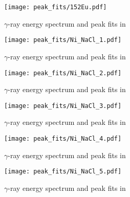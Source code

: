 \begin{figure}[htb]
\texttt{[image: peak\_fits/152Eu.pdf]}
\caption{$\gamma$-ray energy spectrum and peak fits in \texttt{}}
\label{fig:152Eu}
\end{figure}

\begin{figure}[htb]
\texttt{[image: peak\_fits/Ni\_NaCl\_1.pdf]}
\caption{$\gamma$-ray energy spectrum and peak fits in \texttt{}}
\label{fig:Ni_NaCl_1}
\end{figure}

\begin{figure}[htb]
\texttt{[image: peak\_fits/Ni\_NaCl\_2.pdf]}
\caption{$\gamma$-ray energy spectrum and peak fits in \texttt{}}
\label{fig:Ni_NaCl_2}
\end{figure}

\begin{figure}[htb]
\texttt{[image: peak\_fits/Ni\_NaCl\_3.pdf]}
\caption{$\gamma$-ray energy spectrum and peak fits in \texttt{}}
\label{fig:Ni_NaCl_3}
\end{figure}

\begin{figure}[htb]
\texttt{[image: peak\_fits/Ni\_NaCl\_4.pdf]}
\caption{$\gamma$-ray energy spectrum and peak fits in \texttt{}}
\label{fig:Ni_NaCl_4}
\end{figure}

\begin{figure}[htb]
\texttt{[image: peak\_fits/Ni\_NaCl\_5.pdf]}
\caption{$\gamma$-ray energy spectrum and peak fits in \texttt{}}
\label{fig:Ni_NaCl_5}
\end{figure}

